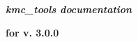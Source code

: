 \documentclass[a4paper,11pt]{article}
\begin{document}
\centerline{\bfseries\LARGE\itshape kmc\_tools documentation}
\bigskip
\bigskip
\centerline{\bfseries\Large for v. 3.0.0}
\bigskip
\bigskip
\bigskip
\bigskip

\tableofcontents





%





%




\end{document}
